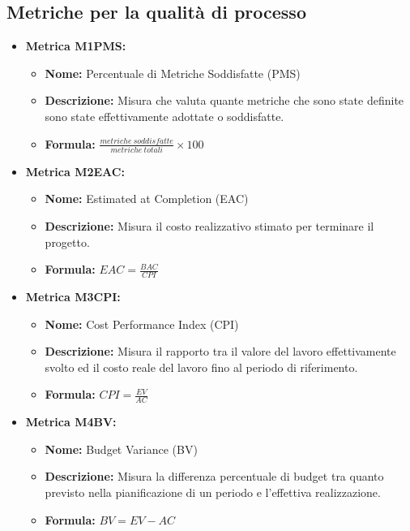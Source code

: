 \subsection{Metriche per la qualità di processo}
\begin{itemize}
    \item \textbf{Metrica M1PMS:}
           \begin{itemize}
            \item \textbf{Nome:} Percentuale di Metriche Soddisfatte (PMS)
            \item \textbf{Descrizione:} Misura che valuta quante metriche che sono state definite sono state effettivamente adottate o soddisfatte.
            \item \textbf{Formula:} $\frac{metriche \ soddisfatte}{metriche \ totali}\times 100$
           \end{itemize}

    \item \textbf{Metrica M2EAC:}
          \begin{itemize}
              \item \textbf{Nome:} Estimated at Completion (EAC)
              \item \textbf{Descrizione:} Misura il costo realizzativo stimato per terminare il progetto.
              \item \textbf{Formula:} $EAC = \frac{BAC}{CPI}$
          \end{itemize}

    \item \textbf{Metrica M3CPI:}
          \begin{itemize}
              \item \textbf{Nome:} Cost Performance Index (CPI)
              \item \textbf{Descrizione:} Misura il rapporto tra il valore del lavoro effettivamente svolto ed il costo reale del lavoro fino al periodo di riferimento.
              \item \textbf{Formula:} $CPI = \frac{EV}{AC}$
          \end{itemize}

    \item \textbf{Metrica M4BV:}
          \begin{itemize}
              \item \textbf{Nome:} Budget Variance (BV)
              \item \textbf{Descrizione:} Misura la differenza percentuale di budget tra quanto previsto nella pianificazione di un periodo e l’effettiva realizzazione.
              \item \textbf{Formula:} $BV = EV - AC $
          \end{itemize}


\end{itemize}
